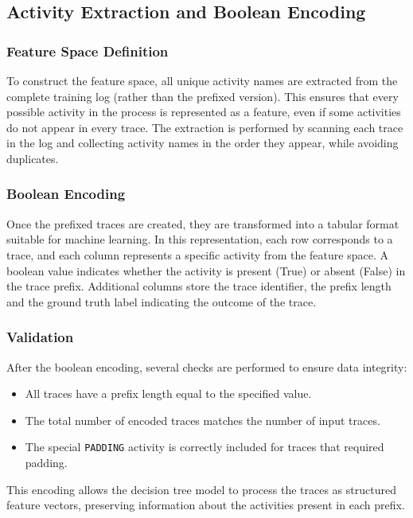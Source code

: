 \documentclass{article}
\begin{document}
\subsection{Activity Extraction and Boolean Encoding}

\subsubsection{Feature Space Definition}

To construct the feature space, all unique activity names are extracted from the complete training log (rather than the prefixed version). This ensures that every possible activity in the process is represented as a feature, even if some activities do not appear in every trace. The extraction is performed by scanning each trace in the log and collecting activity names in the order they appear, while avoiding duplicates. 

\subsubsection{Boolean Encoding}

Once the prefixed traces are created, they are transformed into a tabular format suitable for machine learning. In this representation, each row corresponds to a trace, and each column represents a specific activity from the feature space. A boolean value indicates whether the activity is present (True) or absent (False) in the trace prefix. Additional columns store the trace identifier, the prefix length and the ground truth label indicating the outcome of the trace.

\subsubsection{Validation} After the boolean encoding, several checks are performed to ensure data integrity:
\begin{itemize}
    \item All traces have a prefix length equal to the specified value.
    \item The total number of encoded traces matches the number of input traces.
    \item The special \texttt{PADDING} activity is correctly included for traces that required padding.
\end{itemize}

\noindent
This encoding allows the decision tree model to process the traces as structured feature vectors, preserving information about the activities present in each prefix.
\end{document}
